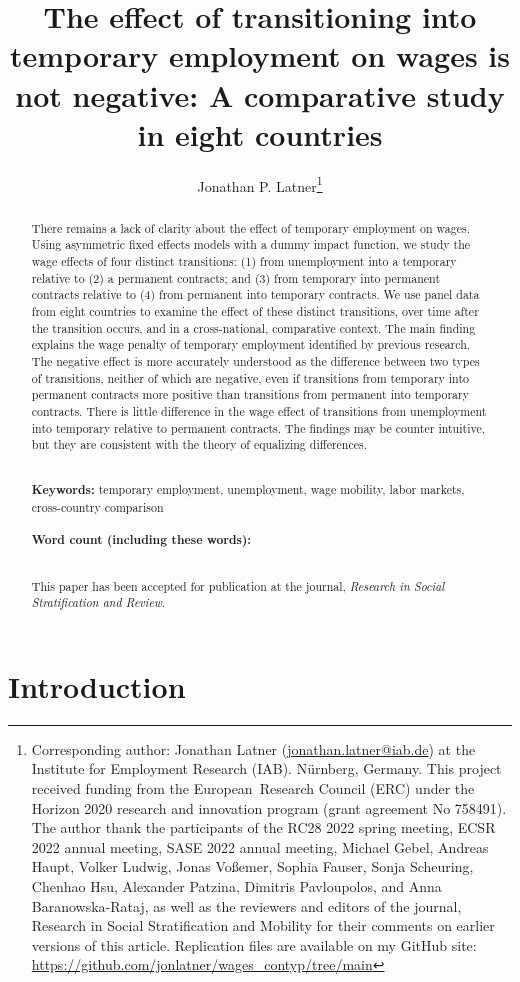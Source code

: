 \documentclass[12pt]{article}
\title{The effect of transitioning into temporary employment on wages is not negative: A comparative study in eight countries}
\author{Jonathan P. Latner\thanks{Corresponding author: Jonathan Latner (\url{jonathan.latner@iab.de}) at the Institute for Employment Research (IAB).  Nürnberg, Germany.  This project received funding from the European\ Research Council (ERC) under the Horizon 2020 research and innovation program (grant agreement No 758491).  The author thank the participants of the RC28 2022 spring meeting, ECSR 2022 annual meeting, SASE 2022 annual meeting, Michael Gebel, Andreas Haupt, Volker Ludwig, Jonas Voßemer, Sophia Fauser, Sonja Scheuring, Chenhao Hsu, Alexander Patzina, Dimitris Pavloupolos, and Anna Baranowska-Rataj, as well as the reviewers and editors of the journal, Research in Social Stratification and Mobility for their comments on earlier versions of this article.  Replication files are available on my GitHub site: \url{https://github.com/jonlatner/wages_contyp/tree/main}}}
\date{\vspace{-5ex}}
\newcommand\wordcount{}
\begin{document}
\maketitle

\begin{abstract}

\noindent 
There remains a lack of clarity about the effect of temporary employment on wages.  Using asymmetric fixed effects models with a dummy impact function, we study the wage effects of four distinct transitions: (1) from unemployment into a temporary relative to (2) a permanent contracts; and (3) from temporary into permanent contracts relative to (4) from permanent into temporary contracts.  We use panel data from eight countries to examine the effect of these distinct transitions, over time after the transition occurs, and in a cross-national, comparative context.  The main finding explains the wage penalty of temporary employment identified by previous research.  The negative effect is more accurately understood as the difference between two types of transitions, neither of which are negative, even if transitions from temporary into permanent contracts more positive than transitions from permanent into temporary contracts.  There is little difference in the wage effect of transitions from unemployment into temporary relative to permanent contracts. The findings may be counter intuitive, but they are consistent with the theory of equalizing differences.  

\noindent
\\
{\bf Keywords:} temporary employment, unemployment, wage mobility, labor markets, cross-country comparison \\
\\
{\bf Word count (including these words):} \wordcount

\noindent
\\
This paper has been accepted for publication at the journal, \emph{Research in Social Stratification and Review}. \\

\end{abstract}

\doublespacing
\clearpage
\section{Introduction}
\end{document}
